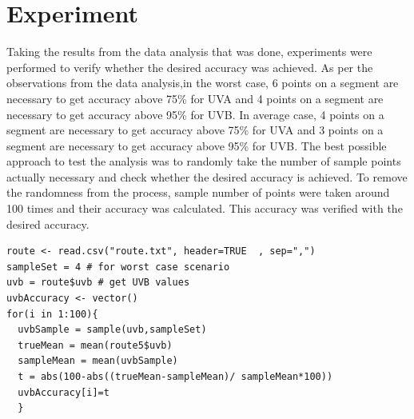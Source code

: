 \documentclass[12pt,fullpage,doublespace]{article}
\begin{document}
\section{Experiment}
Taking the results from the data analysis that was done, experiments were performed to verify whether the desired accuracy was achieved. As per the observations from the data analysis,in the worst case, 6 points on a segment are necessary to get accuracy above 75\% for UVA and 4 points on a segment are necessary to get accuracy above 95\% for UVB.
In average case, 4 points on a segment are necessary to get accuracy above 75\% for UVA and  3 points on a segment are necessary to get accuracy above 95\% for UVB. The best possible approach to test the analysis was to randomly take the number of sample points actually necessary and check whether the desired accuracy is achieved. To remove the randomness from the process, sample number of points were taken around 100 times and their accuracy was calculated. This accuracy was verified with the desired accuracy. 

\lstset{ tabsize=4,      caption=R Code for verifying accuracy,breaklines=true,
        frame=single}
\begin{lstlisting}
route <- read.csv("route.txt", header=TRUE  , sep=",")
sampleSet = 4 # for worst case scenario
uvb = route$uvb # get UVB values
uvbAccuracy <- vector()
for(i in 1:100){
  uvbSample = sample(uvb,sampleSet)
  trueMean = mean(route5$uvb)
  sampleMean = mean(uvbSample)
  t = abs(100-abs((trueMean-sampleMean)/ sampleMean*100))
  uvbAccuracy[i]=t
  }
\end{lstlisting}
\end{document}
